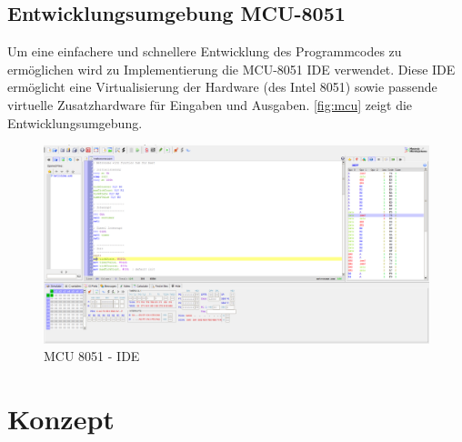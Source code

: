 \documentclass[a4paper, 12pt]{scrartcl}
\begin{document}
\begin{onehalfspace}
\subsection{Entwicklungsumgebung MCU-8051}
Um eine einfachere und schnellere Entwicklung des Programmcodes zu ermöglichen wird zu Implementierung die MCU-8051 IDE verwendet. Diese IDE ermöglicht eine Virtualisierung der Hardware (des Intel 8051) sowie passende virtuelle Zusatzhardware für Eingaben und Ausgaben. \autoref{fig:mcu} zeigt die Entwicklungsumgebung.
\begin{figure}[h]
\centering
\includegraphics[width=\textwidth]{mcu.png}
\caption{MCU 8051 - IDE}
\label{fig:mcu}
\end{figure}

\newpage
\section{Konzept}

\end{onehalfspace}
\end{document}

